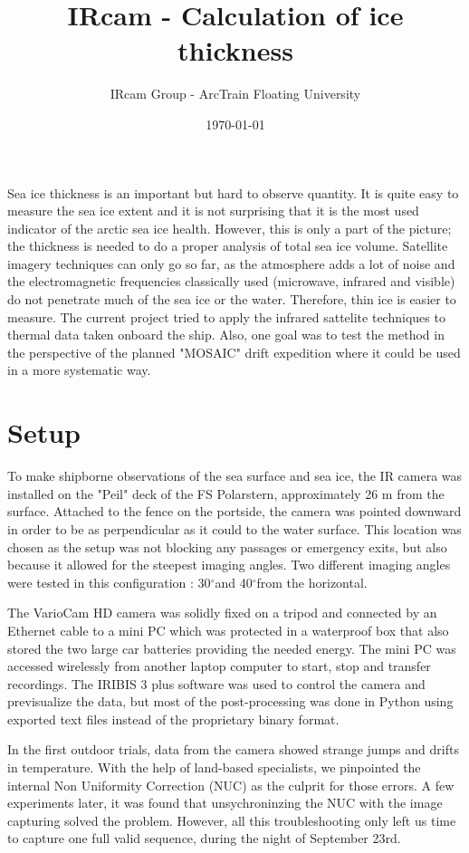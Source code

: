 \documentclass[a4paper,12pt]{article}
\title{IRcam - Calculation of ice thickness}
\author{IRcam Group - ArcTrain Floating University}
\date{\today}
\newcommand{\dg}{$^{\circ}$}
\begin{document}
\maketitle

Sea ice thickness is an important but hard to observe quantity. It is quite easy to measure the sea ice extent and it is not surprising that it is the most used indicator of the arctic sea ice health. However, this is only a part of the picture; the thickness is needed to do a proper analysis of total sea ice volume. Satellite imagery techniques can only go so far, as the atmosphere adds a lot of noise and the electromagnetic frequencies classically used (microwave, infrared and visible) do not penetrate much of the sea ice or the water. Therefore, thin ice is easier to measure. The current project tried to apply the infrared sattelite techniques to thermal data taken onboard the ship. Also, one goal was to test the method in the perspective of the planned "MOSAIC" drift expedition where it could be used in a more systematic way.

\section{Setup}
To make shipborne observations of the sea surface and sea ice, the IR camera was installed on the "Peil" deck of the FS Polarstern, approximately 26 m from the surface. Attached to the fence on the portside, the camera was pointed downward in order to be as perpendicular as it could to the water surface. This location was chosen as the setup was not blocking any passages or emergency exits, but also because it allowed for the steepest imaging angles. Two different imaging angles were tested in this configuration : 30\dg  and 40\dg  from the horizontal. 


The VarioCam HD camera was solidly fixed on a tripod and connected by an Ethernet cable to a mini PC which was protected in a waterproof box that also stored the two large car batteries providing the needed energy. The mini PC was accessed wirelessly from another laptop computer to start, stop and transfer recordings. The IRIBIS 3 plus software was used to control the camera and previsualize the data, but most of the post-processing was done in Python using exported text files instead of the proprietary binary format.


In the first outdoor trials, data from the camera showed strange jumps and drifts in temperature. With the help of land-based specialists, we pinpointed the internal Non Uniformity Correction (NUC) as the culprit for those errors. A few experiments later, it was found that unsychroninzing the NUC with the image capturing solved the problem. However, all this troubleshooting only left us time to capture one full valid sequence, during the night of September 23rd.
\end{document}
